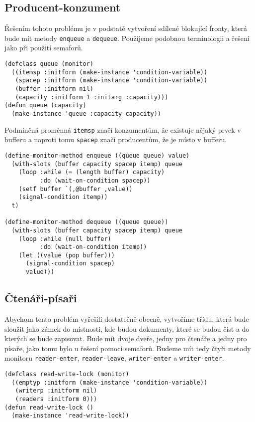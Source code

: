 \documentclass {article}
\theoremstyle {definition}
\begin{document}
\subsection {Producent-konzument}
Řešením tohoto problému je v podstatě vytvoření sdílené blokující
fronty, která bude mít metody \texttt{enqueue} a
\texttt{dequeue}. Použijeme podobnou terminologii a řešení jako při
použití semaforů.

\begin{verbatim}
(defclass queue (monitor)
  ((itemsp :initform (make-instance 'condition-variable))
   (spacep :initform (make-instance 'condition-variable))
   (buffer :initform nil)
   (capacity :initform 1 :initarg :capacity)))
(defun queue (capacity)
  (make-instance 'queue :capacity capacity))
\end{verbatim}

Podmíněná proměnná \texttt {itemsp} značí konzumentům, že existuje
nějaký prvek v bufferu a naproti tomu \texttt {spacep} značí
producentům, že je místo v bufferu.

\begin{verbatim}
(define-monitor-method enqueue ((queue queue) value)
  (with-slots (buffer capacity spacep itemp) queue
    (loop :while (= (length buffer) capacity)
          :do (wait-on-condition spacep))
    (setf buffer `(,@buffer ,value))
    (signal-condition itemp))
  t)
                 
(define-monitor-method dequeue ((queue queue))
  (with-slots (buffer capacity spacep itemp) queue
    (loop :while (null buffer)
          :do (wait-on-condition itemp))
    (let ((value (pop buffer)))
      (signal-condition spacep)
      value)))
\end{verbatim}


\subsection {Čtenáři-písaři}
Abychom tento problém vyřešili dostatečně obecně, vytvoříme třídu,
která bude sloužit jako zámek do místnosti, kde budou dokumenty, které
se budou číst a do kterých se bude zapisovat. Bude mít dvoje dveře,
jedny pro čtenáře a jedny pro písaře, jako tomu bylo u řešení pomocí
semaforů. Budeme mít tedy čtyři metody monitoru \texttt{reader-enter},
\texttt{reader-leave}, \texttt{writer-enter} a \texttt{writer-enter}.

\begin{verbatim}
(defclass read-write-lock (monitor)
  ((emptyp :initform (make-instance 'condition-variable))
   (writerp :initform nil)
   (readers :initform 0)))
(defun read-write-lock ()
  (make-instance 'read-write-lock))
\end{verbatim}
\end{document}
